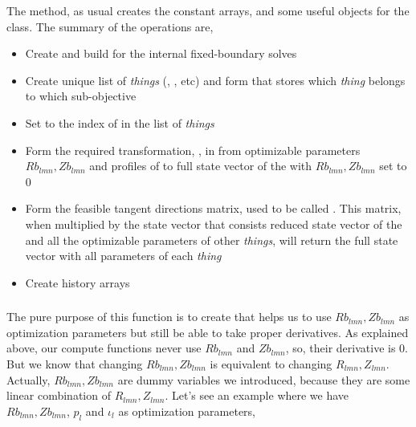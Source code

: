 The  method, as usual creates the constant arrays, and some useful objects for the class. The summary of the operations are,
\begin{itemize}
    \item Create and build  for the internal fixed-boundary  solves
    \item Create unique list of \textit{things} (, ,  etc) and form  that stores which \textit{thing} belongs to which sub-objective
    \item Set  to the index of  in the list of \textit{things} 
    \item Form the required transformation, , in  from optimizable parameters $Rb_{lmn}, Zb_{lmn}$ and profiles of  to full state vector of the  with $Rb_{lmn}, Zb_{lmn}$ set to 0
    \item Form the feasible tangent directions matrix,  used to be called . This matrix, when multiplied by the state vector that consists reduced state vector of the  and all the optimizable parameters of other \textit{things}, will return the full state vector with all parameters of each \textit{thing}
    \item Create history arrays
\end{itemize}

\subsubsection{}

The pure purpose of this function is to create  that helps us to use $Rb_{lmn}, Zb_{lmn}$ as optimization parameters but still be able to take proper derivatives. As explained above, our compute functions never use $Rb_{lmn}$ and $Zb_{lmn}$, so, their derivative is 0. But we know that changing $Rb_{lmn}, Zb_{lmn}$ is equivalent to changing $R_{lmn}, Z_{lmn}$. Actually, $Rb_{lmn}, Zb_{lmn}$ are dummy variables we introduced, because they are some linear combination of $R_{lmn}, Z_{lmn}$. Let's see an example where we have $Rb_{lmn}, Zb_{lmn}$, $p_l$ and $\iota_l$ as optimization parameters,

